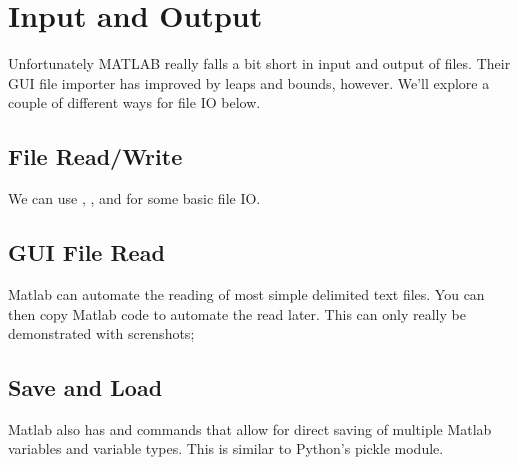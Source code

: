 
\section{Input and Output}
Unfortunately MATLAB really falls a bit short in input and output of files.
 Their GUI file importer has improved by leaps and bounds, however.
 We'll explore a couple of different ways for file IO below.

\subsection{File Read/Write}
We can use , , and  for some basic file IO.

\begin{quote}

\end{quote}

\pagebreak
\subsection{GUI File Read}
Matlab can automate the reading of most simple delimited text files.
 You can then copy Matlab code to automate the read later.
 This can only really be demonstrated with screnshots;

\begin{quote}
 
\end{quote}

\pagebreak
\subsection{Save and Load}
Matlab also has  and  commands that allow for direct saving of multiple Matlab variables and variable types.
 This is similar to Python's pickle module.

\begin{quote}
 
\end{quote}
